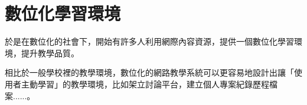 \renewcommand{\baselinestretch}{20} %
\section{數位化學習環境}
\par
\renewcommand{\baselinestretch}{1} %
\fontsize{12pt}\baselineskip\selectfont\qquad 於是在數位化的社會下，開始有許多人利用網際內容資源，提供一個數位化學習環境，提升教學品質。\\
\par
\renewcommand{\baselinestretch}{1} %
\fontsize{12pt}\baselineskip\selectfont\hspace{0.5em} 相比於一般學校裡的教學環境，數位化的網路教學系統可以更容易地設計出讓「使用者主動學習」的教學環境，比如架立討論平台，建立個人專案紀錄歷程檔案......。
\par

\renewcommand{\baselinestretch}{20} %
